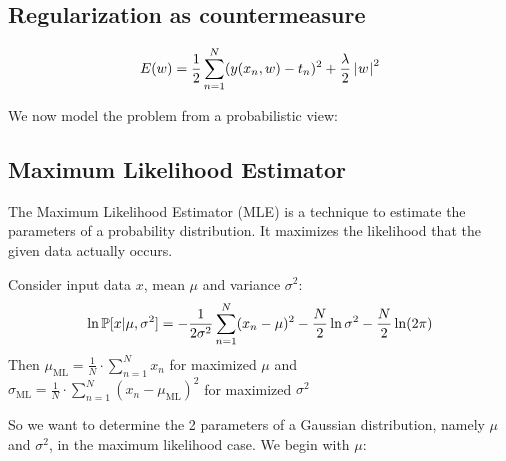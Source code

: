 
\subsection{Regularization as countermeasure}
\[ E(w) = \frac12 \sum_{n=1}^N (y(x_n, w) - t_n)^2 + \frac{\lambda}{2} \left|\hspace{0.6999pt}w\hspace{0.6999pt}\right|^2 \]


We now model the problem from a probabilistic view:

\subsection{Maximum Likelihood Estimator}
%
%
%
The Maximum Likelihood Estimator (MLE) is a technique to estimate the parameters of a probability distribution.
It maximizes the likelihood that the given data actually occurs.


\begin{theorem}
  Consider input data $x$, mean $\mu$ and variance $\sigma^2$:
  \[ \ln{\mathbb P[x | \mu, \sigma^2]} = -\frac1{2\sigma^2} \sum_{n=1}^N (x_n - \mu)^2 - \frac{N}{2} \ln{\sigma^2} - \frac{N}{2} \ln(2\pi) \]
  Then
  $\mu_{\text{ML}} = \frac{1}{N} \cdot \sum_{n=1}^N x_n$ for maximized $\mu$ and \\
    $\sigma_{\text{ML}} = \frac{1}{N}\cdot \sum_{n=1}^N (x_n - \mu_{\text{ML}})^2$ for maximized $\sigma^2$
\end{theorem}

So we want to determine the 2 parameters of a Gaussian distribution, namely $\mu$ and $\sigma^2$, in the maximum likelihood case.
We begin with $\mu$:

